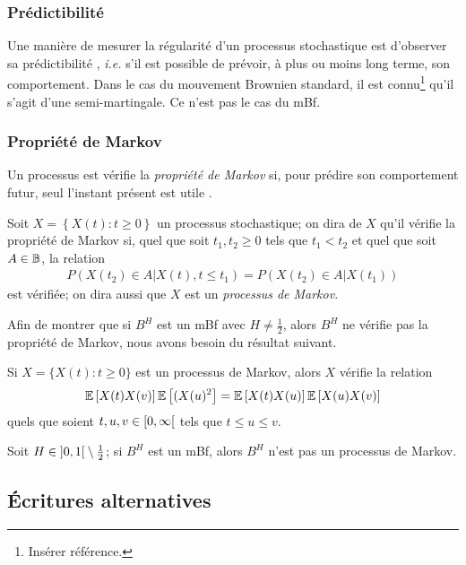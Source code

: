 \subsubsection{Prédictibilité}
\label{subsubsec\string:fBm-predictability}

Une manière de mesurer la régularité d'un processus stochastique est
d'observer sa \og prédictibilité \fg{}, \emph{i.e.} s'il est possible
de prévoir, à plus ou moins long terme, son comportement. Dans le cas
du mouvement Brownien standard, il est connu\footnote{Insérer
  référence.} qu'il s'agit d'une semi-martingale. Ce n'est pas le cas
du mBf.

\subsubsection{Propriété de Markov}
\label{subsubsec\string:fBm-markov}

Un processus est vérifie la \emph{propriété de Markov} si, pour
prédire son comportement futur, seul l'instant présent est \og utile
\fg.

\begin{definition}
  Soit $X = \left\{X(t) : t\geq 0\right\}$ un processus stochastique;
  on dira de $X$ qu'il vérifie la propriété de Markov si, quel que
  soit $t_1,t_2\geq 0$ tels que $t_1<t_2$ et quel que soit $A\in\mathbb{B}$,
  la relation
  \begin{align}
    P(X(t_2) \in A| X(t), t\leq t_1) = P(X(t_2) \in A| X(t_1))
  \end{align}
  est vérifiée; on dira aussi que $X$ est un \emph{processus de
    Markov}.
\end{definition}

Afin de montrer que si $B^H$ est un mBf avec $H\neq\frac{1}{2}$, alors
$B^H$ ne vérifie pas la propriété de Markov, nous avons besoin du
résultat suivant.

\begin{lemme}
  Si $X = \{X(t) : t\geq 0\}$ est un processus de Markov, alors $X$
  vérifie la relation
  \begin{align}
    \mathbb{E}\left[X(t)X(v)\right]\mathbb{E}\left[(X(u)^2\right] = \mathbb{E}\left[X(t)X(u)\right]\mathbb{E}\left[X(u)X(v)\right]
  \end{align}
  quels que soient $t,u,v\in\left[0,\infty\right[$ tels que
  $t\leq u\leq v$.
\end{lemme}

\begin{theoreme}
  Soit $H\in\left]0,1\right[\setminus\frac{1}{2}$; si $B^H$ est un mBf,
  alors $B^H$ n'est pas un processus de Markov.
\end{theoreme}

\subsection{Écritures alternatives}
\label{subsec\string:fBm-other-forms}

